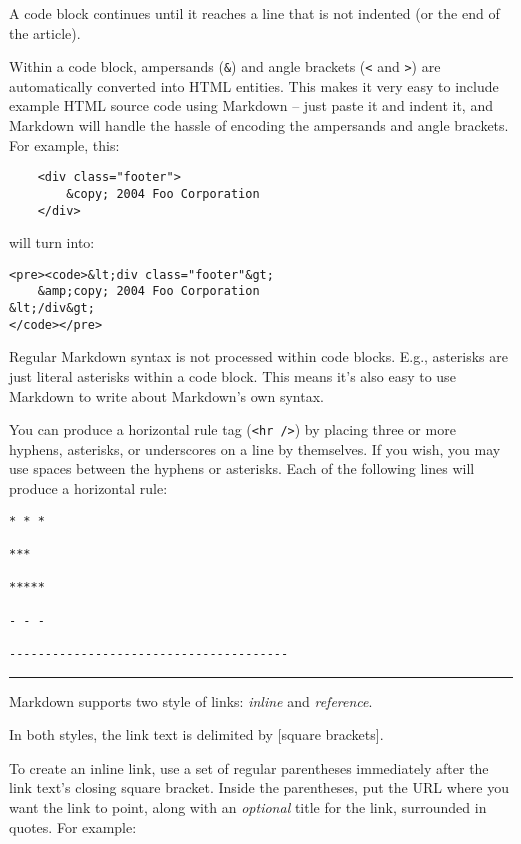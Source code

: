 A code block continues until it reaches a line that is not indented
(or the end of the article).

Within a code block, ampersands (\texttt{\&}) and angle brackets (\texttt{<} and \texttt{>})
are automatically converted into HTML entities. This makes it very
easy to include example HTML source code using Markdown -- just paste
it and indent it, and Markdown will handle the hassle of encoding the
ampersands and angle brackets. For example, this:

\begin{verbatim}
    <div class="footer">
        &copy; 2004 Foo Corporation
    </div>
\end{verbatim}

will turn into:

\begin{verbatim}
<pre><code>&lt;div class="footer"&gt;
    &amp;copy; 2004 Foo Corporation
&lt;/div&gt;
</code></pre>
\end{verbatim}

Regular Markdown syntax is not processed within code blocks. E.g.,
asterisks are just literal asterisks within a code block. This means
it's also easy to use Markdown to write about Markdown's own syntax.

You can produce a horizontal rule tag (\texttt{<hr \slash >}) by placing three or
more hyphens, asterisks, or underscores on a line by themselves. If you
wish, you may use spaces between the hyphens or asterisks. Each of the
following lines will produce a horizontal rule:

\begin{verbatim}
* * *

***

*****

- - -

---------------------------------------
\end{verbatim}

\begin{center}\rule{3in}{0.4pt}\end{center}

Markdown supports two style of links: \emph{inline} and \emph{reference}.

In both styles, the link text is delimited by {[square brackets]}.

To create an inline link, use a set of regular parentheses immediately
after the link text's closing square bracket. Inside the parentheses,
put the URL where you want the link to point, along with an \emph{optional}
title for the link, surrounded in quotes. For example:

